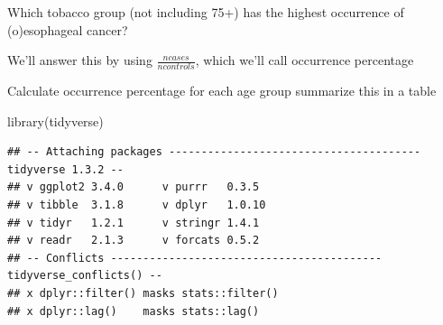 \documentclass[
]{article}
\newenvironment{Shaded}{\begin{snugshade}}{\end{snugshade}}
\newcommand{\AttributeTok}[1]{\textcolor[rgb]{0.77,0.63,0.00}{#1}}
\newcommand{\FunctionTok}[1]{\textcolor[rgb]{0.00,0.00,0.00}{#1}}
\newcommand{\NormalTok}[1]{#1}
\newcommand{\OtherTok}[1]{\textcolor[rgb]{0.56,0.35,0.01}{#1}}
\newcommand{\SpecialCharTok}[1]{\textcolor[rgb]{0.00,0.00,0.00}{#1}}
\newcommand{\StringTok}[1]{\textcolor[rgb]{0.31,0.60,0.02}{#1}}
\begin{document}
Which tobacco group (not including 75+) has the highest occurrence of
(o)esophageal cancer?

We'll answer this by using \(\frac{ncases}{ncontrols}\), which we'll
call occurrence percentage

Calculate occurrence percentage for each age group summarize this in a
table

\begin{Shaded}
\begin{Highlighting}[]
\FunctionTok{library}\NormalTok{(tidyverse)}
\end{Highlighting}
\end{Shaded}

\begin{verbatim}
## -- Attaching packages --------------------------------------- tidyverse 1.3.2 --
## v ggplot2 3.4.0      v purrr   0.3.5 
## v tibble  3.1.8      v dplyr   1.0.10
## v tidyr   1.2.1      v stringr 1.4.1 
## v readr   2.1.3      v forcats 0.5.2 
## -- Conflicts ------------------------------------------ tidyverse_conflicts() --
## x dplyr::filter() masks stats::filter()
## x dplyr::lag()    masks stats::lag()
\end{verbatim}

\begin{Shaded}
\end{Shaded}
\end{document}
